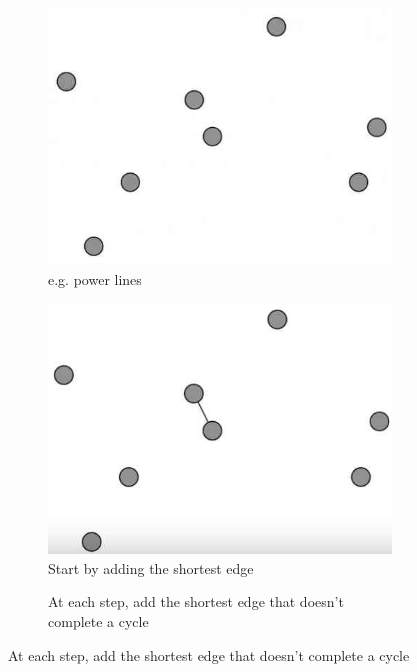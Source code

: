 \documentclass[]{article}
\begin{document}
\begin{figure}[H]
	\caption{Minimum Spanning Tree}
	\begin{subfigure}[t]{0.45\textwidth}
		\caption{e.g. power lines}
		\includegraphics[width=\textwidth]{mst1}
	\end{subfigure}
	\;\;\;
	\begin{subfigure}[t]{0.45\textwidth}
		\caption{Start by adding the shortest edge}
		\includegraphics[width=\textwidth]{mst2}
	\end{subfigure}
	\begin{subfigure}[b]{0.45\textwidth}
		\caption{At each step, add the shortest edge that doesn't complete a cycle}

\end{subfigure}
\end{figure}
\end{document}
